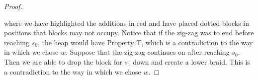 \begin{theorem}
\begin{proof}
\begin{center}
	\end{center}
	where we have highlighted the additions in \textcolor{rred}{red} and have placed dotted blocks in positions that blocks may not occupy. Notice that if the zig-zag was to end before reaching $s_0$, the heap would have Property T, which is a contradiction to the way in which we chose $w$. Suppose that the zig-zag continues on after reaching $s_0$. Then we are able to drop the block for $s_1$ down and create a lower braid. This is a contradiction to the way in which we chose $w$.
	

\end{proof}
\end{theorem}

